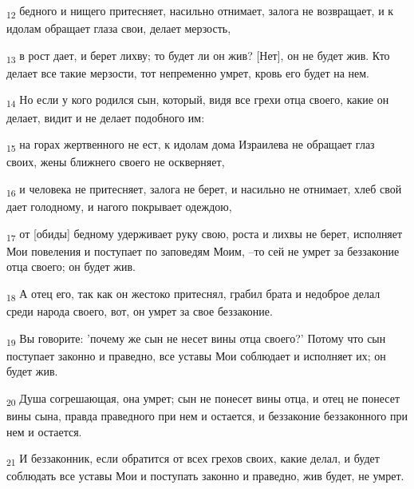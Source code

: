 \begin{tcolorbox}
\textsubscript{12} бедного и нищего притесняет, насильно отнимает, залога не возвращает, и к идолам обращает глаза свои, делает мерзость,
\end{tcolorbox}
\begin{tcolorbox}
\textsubscript{13} в рост дает, и берет лихву; то будет ли он жив? [Нет], он не будет жив. Кто делает все такие мерзости, тот непременно умрет, кровь его будет на нем.
\end{tcolorbox}
\begin{tcolorbox}
\textsubscript{14} Но если у кого родился сын, который, видя все грехи отца своего, какие он делает, видит и не делает подобного им:
\end{tcolorbox}
\begin{tcolorbox}
\textsubscript{15} на горах жертвенного не ест, к идолам дома Израилева не обращает глаз своих, жены ближнего своего не оскверняет,
\end{tcolorbox}
\begin{tcolorbox}
\textsubscript{16} и человека не притесняет, залога не берет, и насильно не отнимает, хлеб свой дает голодному, и нагого покрывает одеждою,
\end{tcolorbox}
\begin{tcolorbox}
\textsubscript{17} от [обиды] бедному удерживает руку свою, роста и лихвы не берет, исполняет Мои повеления и поступает по заповедям Моим, --то сей не умрет за беззаконие отца своего; он будет жив.
\end{tcolorbox}
\begin{tcolorbox}
\textsubscript{18} А отец его, так как он жестоко притеснял, грабил брата и недоброе делал среди народа своего, вот, он умрет за свое беззаконие.
\end{tcolorbox}
\begin{tcolorbox}
\textsubscript{19} Вы говорите: 'почему же сын не несет вины отца своего?' Потому что сын поступает законно и праведно, все уставы Мои соблюдает и исполняет их; он будет жив.
\end{tcolorbox}
\begin{tcolorbox}
\textsubscript{20} Душа согрешающая, она умрет; сын не понесет вины отца, и отец не понесет вины сына, правда праведного при нем и остается, и беззаконие беззаконного при нем и остается.
\end{tcolorbox}
\begin{tcolorbox}
\textsubscript{21} И беззаконник, если обратится от всех грехов своих, какие делал, и будет соблюдать все уставы Мои и поступать законно и праведно, жив будет, не умрет.
\end{tcolorbox}
